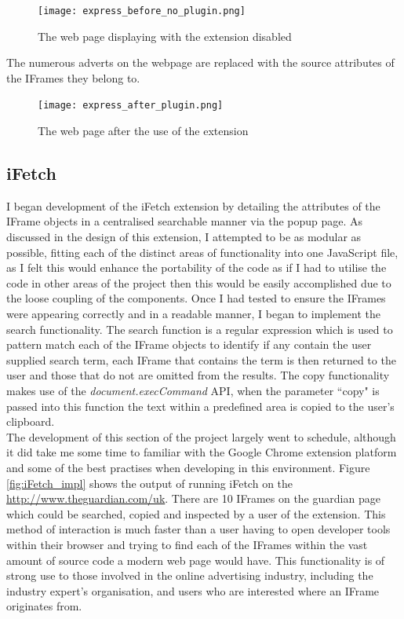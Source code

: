 \documentclass[12pt]{article}
\begin{document}
\begin{figure}[H]
    \centering
    \texttt{[image: express\_before\_no\_plugin.png]}
    \caption{The web page displaying with the extension disabled}
    \label{fig:express_before_no_plugin}
\end{figure}

The numerous adverts on the webpage are replaced with the source attributes of the IFrames they belong to.

\begin{figure}[H]
    \centering
    \texttt{[image: express\_after\_plugin.png]}
    \caption{The web page after the use of the extension}
    \label{fig:express_after_plugin}
\end{figure}

\subsection{iFetch}
I began development of the iFetch extension by detailing the attributes of the IFrame objects in a centralised searchable manner via the popup page. As discussed in the design of this extension, I attempted to be as modular as possible, fitting each of the distinct areas of functionality into one JavaScript file, as I felt this would enhance the portability of the code as if I had to utilise the code in other areas of the project then this would be easily accomplished due to the loose coupling of the components. Once I had tested to ensure the IFrames were appearing correctly and in a readable manner, I began to implement the search functionality. The search function is a regular expression which is used to pattern match each of the IFrame objects to identify if any contain the user supplied search term, each IFrame that contains the term is then returned to the user and those that do not are omitted from the results. The copy functionality makes use of the \textit{document.execCommand} API, when the parameter ``copy" is passed into this function the text within a predefined area is copied to the user's clipboard. \\

The development of this section of the project largely went to schedule, although it did take me some time to familiar with the Google Chrome extension platform and some of the best practises when developing in this environment. Figure \ref{fig:iFetch_impl} shows the output of running iFetch on the \url{http://www.theguardian.com/uk}. There are 10 IFrames on the guardian page which could be searched, copied and inspected by a user of the extension. This method of interaction is much faster than a user having to open developer tools within their browser and trying to find each of the IFrames within the vast amount of source code a modern web page would have. This functionality is of strong use to those involved in the online advertising industry, including the industry expert's organisation, and users who are interested where an IFrame originates from.     
\end{document}
